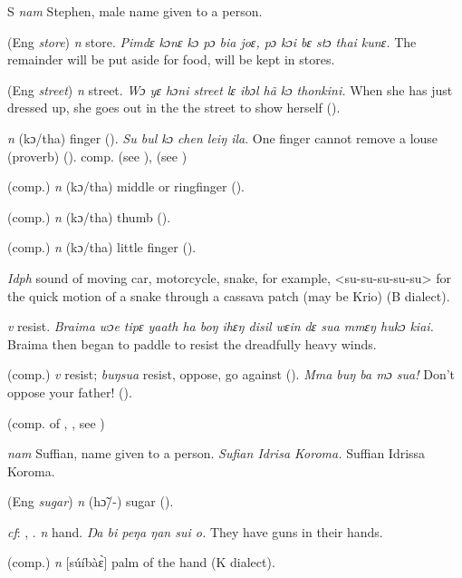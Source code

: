 \begin{letter}{S}
 \textit{nam} Stephen, male name given to a person.

 (Eng \textit{store}) \textit{n} store. \textit{Pimdɛ kɔnɛ kɔ pɔ bia joɛ, pɔ kɔi bɛ stɔ thai kunɛ.} The remainder will be put aside for food, will be kept in stores.

 (Eng \textit{street}) \textit{n} street. \textit{Wɔ yɛ hɔni street lɛ ibɔl hã kɔ thonkini.} When she has just dressed up, she goes out in the the street to show herself (\citealt{Pichl1967}). 

 \textit{n} (kɔ/tha) finger (\citealt{Pichl1967}). \textit{Su bul kɔ chen leiŋ ila}. One finger cannot remove a louse (proverb) (\citealt{TISLL1979}). comp.  (see ),  (see ) 

 (comp.) \textit{n} (kɔ/tha) middle or ringfinger (\citealt{Pichl1967}).

 (comp.) \textit{n} (kɔ/tha) thumb (\citealt{Pichl1967}).

 (comp.) \textit{n} (kɔ/tha) little finger (\citealt{Pichl1967}).

 \textit{Idph} sound of moving car, motorcycle, snake, for example, <su-su-su-su-su> for the quick motion of a snake through a cassava patch (may be Krio) (B dialect). 

 \textit{v} resist. \textit{Braima wɔe tipɛ yaath ha boŋ ihɛŋ disil wɛin dɛ sua mmɛŋ hukɔ kiai.} Braima then began to paddle to resist the dreadfully heavy winds.

 (comp.) \textit{v} resist; \textit{buŋsua} resist, oppose, go against (\citealt{Pichl1967}). \textit{Mma buŋ ba mɔ sua!} Don't oppose your father! (\citealt{Pichl1967}).

 (comp. of , , see ) 

 \textit{nam} Suffian, name given to a person. \textit{Sufian Idrisa Koroma.} Suffian Idrissa Koroma.

 (Eng \textit{sugar}) \textit{n} (hɔ̃/-) sugar (\citealt{Pichl1967}). 

 \textit{cf}: , . \textit{n} hand. \textit{Ŋa bi peŋa ŋan sui o.} They have guns in their hands.

 (comp.) \textit{n} [súíbàɛ̀] palm of the hand (K dialect). 


\end{letter}
